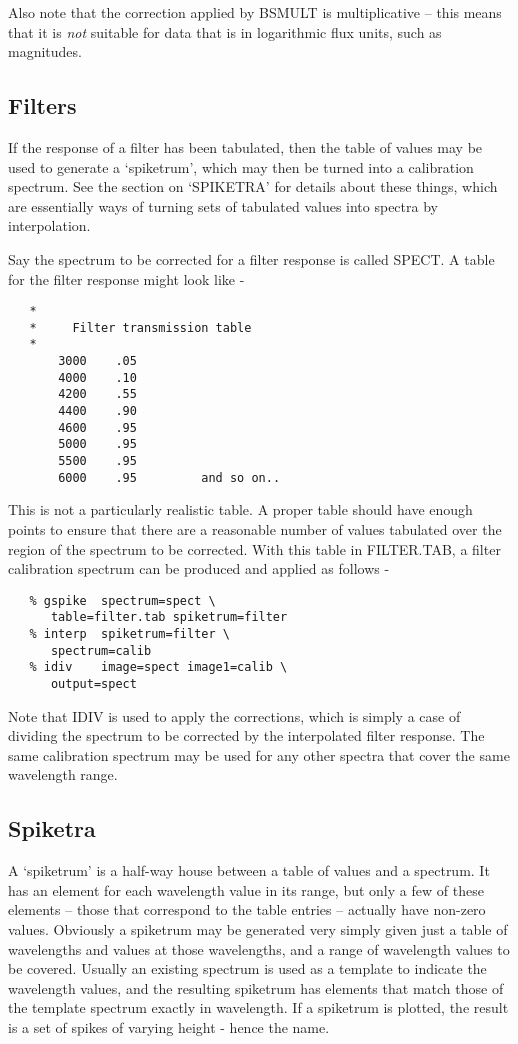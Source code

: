 Also note that the correction applied by BSMULT is multiplicative --
this means that it is {\it not} suitable for data that is in logarithmic flux
units, such as magnitudes.


\subsection{Filters}

If the response of a filter has been tabulated, then the table of
values may be used to generate a `spike\-trum', which may then be turned
into a calibration spectrum.  See the section on `SPIKETRA' for details
about these things, which are essentially ways of turning sets of tabulated
values into spectra by interpolation.

Say the spectrum to be corrected for a filter response is called
SPECT.  A table for the filter response might look like -

\goodbreak
\begin{verbatim}
   *
   *     Filter transmission table
   *
       3000    .05
       4000    .10
       4200    .55
       4400    .90
       4600    .95
       5000    .95
       5500    .95
       6000    .95         and so on..
\end{verbatim}
\goodbreak

This is not a particularly realistic table.  A proper table should
have enough points to ensure that there are a reasonable number of values
tabulated over the region of the spectrum to be corrected.  With this table
in FILTER.TAB, a filter calibration spectrum can be produced and 
applied as follows -

\begin{verbatim}
   % gspike  spectrum=spect \
      table=filter.tab spiketrum=filter
   % interp  spiketrum=filter \
      spectrum=calib
   % idiv    image=spect image1=calib \
      output=spect
\end{verbatim}

Note that IDIV is used to apply the corrections, which is simply
a case of dividing the spectrum to be corrected by the interpolated
filter response.  The same calibration spectrum may be used for any
other spectra that cover the same wavelength range.


\subsection{Spiketra}

A `spike\-trum' is a half-way house between a
table of values and a spectrum.  It has an element for each wavelength
value in its range, but only a few of these elements -- those that correspond
to the table entries -- actually have non-zero values.  Obviously a spike\-trum
may be generated very simply given just a table of wavelengths and values
at those wavelengths, and a range of wavelength values to be covered.
Usually an existing spectrum is used as a template to indicate the
wavelength values, and the resulting spike\-trum has elements that match
those of the template spectrum exactly in wavelength.  If a spike\-trum is
plotted, the result is a set of spikes of varying height - hence the name.

